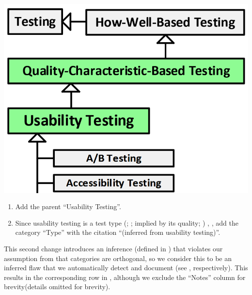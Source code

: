 \begin{minipage}{0.45\linewidth}
    \vspace{0.5cm}
    \includegraphics[width=\linewidth]{assets/images/a-b testing 2.png}
    \label{fig:Firesmith-A-B-Testing}
    \vspace{0.5cm}
\end{minipage}
\begin{minipage}{\ifnotpaper 0.53\else 0.5\fi\linewidth}
    \begin{enumerate}
        \item Add the parent ``Usability Testing''.
        \item Since usability testing is a test type \ifnotpaper
                  (\citealp[pp.~22, 26\=/27]{IEEE2022};
                  \citeyear[pp.~7, 40, Tab.~A.1]{IEEE2021c};
                  implied by its quality; \citealp[p.~53]{Firesmith2015})\else
                  \cite[pp.~22, 26\=/27]{IEEE2022},
                  \cite[pp.~7, 40, Tab.~A.1]{IEEE2021c}\fi, add the category
              ``Type'' with the citation ``(inferred from usability testing)''.
    \end{enumerate}
\end{minipage}
This second change introduces an inference \ifnotpaper (defined in )
\fi that violates our assumption \ifnotpaper from  \fi that
categories are orthogonal, so we consider this to be an inferred flaw that we
automatically detect and document \ifnotpaper (see , respectively). This results in the corresponding row
    in , although we exclude the ``Notes''
    column for brevity\else (details omitted for brevity)\fi.

